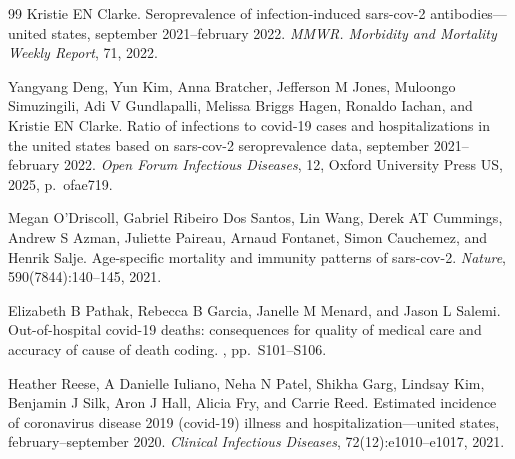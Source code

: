\documentclass[11pt]{article}
\begin{document}
\begin{thebibliography}{99}
Kristie EN Clarke.
\newblock Seroprevalence of infection-induced sars-cov-2 antibodies---united states, september 2021--february 2022.
\newblock \textit{MMWR. Morbidity and Mortality Weekly Report}, 71, 2022.

Yangyang Deng, Yun Kim, Anna Bratcher, Jefferson M Jones, Muloongo Simuzingili, Adi V Gundlapalli, Melissa Briggs Hagen, Ronaldo Iachan, and Kristie EN Clarke.
\newblock Ratio of infections to covid-19 cases and hospitalizations in the united states based on sars-cov-2 seroprevalence data, september 2021--february 2022.
\newblock \textit{Open Forum Infectious Diseases}, 12, Oxford University Press US, 2025, p.~ofae719.

Megan O'Driscoll, Gabriel Ribeiro Dos Santos, Lin Wang, Derek AT Cummings, Andrew S Azman, Juliette Paireau, Arnaud Fontanet, Simon Cauchemez, and Henrik Salje.
\newblock Age-specific mortality and immunity patterns of sars-cov-2.
\newblock \textit{Nature}, 590(7844):140--145, 2021.

Elizabeth B Pathak, Rebecca B Garcia, Janelle M Menard, and Jason L Salemi.
\newblock Out-of-hospital covid-19 deaths: consequences for quality of medical care and accuracy of cause of death coding.
, pp.~S101--S106.

Heather Reese, A Danielle Iuliano, Neha N Patel, Shikha Garg, Lindsay Kim, Benjamin J Silk, Aron J Hall, Alicia Fry, and Carrie Reed.
\newblock Estimated incidence of coronavirus disease 2019 (covid-19) illness and hospitalization---united states, february--september 2020.
\newblock \textit{Clinical Infectious Diseases}, 72(12):e1010--e1017, 2021.
\end{thebibliography}
\end{document}
